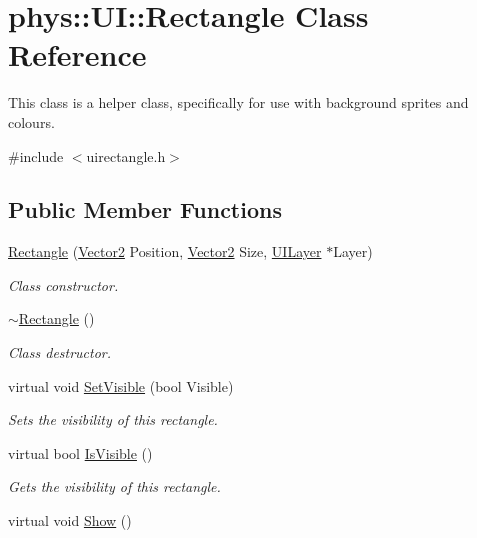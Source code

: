 \hypertarget{classphys_1_1UI_1_1Rectangle}{
\section{phys::UI::Rectangle Class Reference}
\label{d1/d5d/classphys_1_1UI_1_1Rectangle}
}


This class is a helper class, specifically for use with background sprites and colours.  




{\ttfamily \#include $<$uirectangle.h$>$}

\subsection*{Public Member Functions}
\begin{DoxyCompactItemize}
\item 
\hyperlink{classphys_1_1UI_1_1Rectangle_af934bcacaa658b2d15e4b7c9ba1bc225}{Rectangle} (\hyperlink{classphys_1_1Vector2}{Vector2} Position, \hyperlink{classphys_1_1Vector2}{Vector2} Size, \hyperlink{classphys_1_1UILayer}{UILayer} $\ast$Layer)
\begin{DoxyCompactList}\small\item\em Class constructor. \item\end{DoxyCompactList}\item 
\hypertarget{classphys_1_1UI_1_1Rectangle_a8862c7e04c2b8911eac4a2d3b6aff165}{
\hyperlink{classphys_1_1UI_1_1Rectangle_a8862c7e04c2b8911eac4a2d3b6aff165}{$\sim$Rectangle} ()}
\label{d1/d5d/classphys_1_1UI_1_1Rectangle_a8862c7e04c2b8911eac4a2d3b6aff165}

\begin{DoxyCompactList}\small\item\em Class destructor. \item\end{DoxyCompactList}\item 
virtual void \hyperlink{classphys_1_1UI_1_1Rectangle_a4fa5021010e8cdaf9a9e35b3d4c82461}{SetVisible} (bool Visible)
\begin{DoxyCompactList}\small\item\em Sets the visibility of this rectangle. \item\end{DoxyCompactList}\item 
virtual bool \hyperlink{classphys_1_1UI_1_1Rectangle_aad47a2d9a7c9d8d9111b2edbf44541d5}{IsVisible} ()
\begin{DoxyCompactList}\small\item\em Gets the visibility of this rectangle. \item\end{DoxyCompactList}\item 
\hypertarget{classphys_1_1UI_1_1Rectangle_ab408c7607150b24fbc4f70870705a121}{
virtual void \hyperlink{classphys_1_1UI_1_1Rectangle_ab408c7607150b24fbc4f70870705a121}{Show} ()}
\label{d1/d5d/classphys_1_1UI_1_1Rectangle_ab408c7607150b24fbc4f70870705a121}


\end{DoxyCompactItemize}
